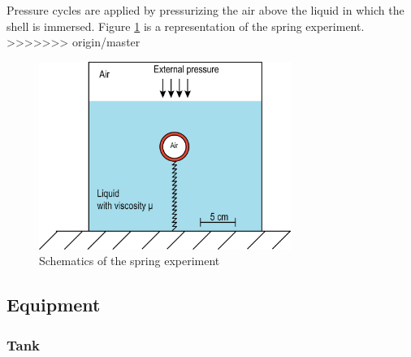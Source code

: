 Pressure cycles are applied by pressurizing the air above the liquid in which the shell is immersed. Figure \ref{fig:spring_experiment_schematic} is a representation of the spring experiment.
>>>>>>> origin/master
\begin{figure}[H] %
	\centering%
  \includegraphics[width=0.73\textwidth]{figures/Chapter_1/schematic_experimental_setup.png}
	\caption{Schematics of the spring experiment}
	\label{fig:spring_experiment_schematic}
\end{figure}

\subsection{Equipment}
\subsubsection{Tank}
